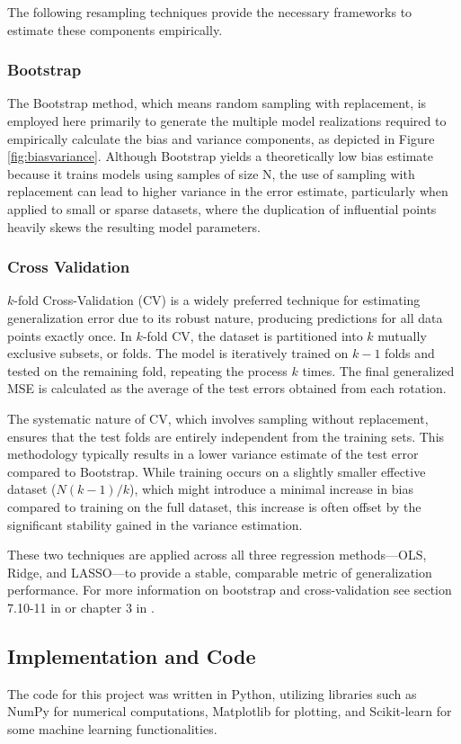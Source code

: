 \documentclass[twocolumn,aps]{revtex4}
\begin{document}
The following resampling techniques provide the necessary frameworks to estimate these components empirically.

\subsubsection{Bootstrap}
The Bootstrap method, which means random sampling with replacement, is employed here primarily to generate the multiple model realizations required to empirically calculate the bias and variance components, as depicted in Figure \ref{fig:biasvariance}. 
Although Bootstrap yields a theoretically low bias estimate because it trains models using samples of size N, the use of sampling with replacement can lead to higher variance in the error estimate, particularly when applied to small or sparse datasets, where the duplication of influential points heavily skews the resulting model parameters.

\subsubsection{Cross Validation}
$k$-fold Cross-Validation (CV) is a widely preferred technique for estimating generalization error due to its robust nature, producing predictions for all data points exactly once.
In $k$-fold CV, the dataset is partitioned into $k$ mutually exclusive subsets, or folds. 
The model is iteratively trained on $k-1$ folds and tested on the remaining fold, repeating the process $k$ times. 
The final generalized MSE is calculated as the average of the test errors obtained from each rotation.

The systematic nature of CV, which involves sampling without replacement, ensures that the test folds are entirely independent from the training sets. 
This methodology typically results in a lower variance estimate of the test error compared to Bootstrap. 
While training occurs on a slightly smaller effective dataset ($N(k-1)/k$), which might introduce a minimal increase in bias compared to training on the full dataset, this increase is often offset by the significant stability gained in the variance estimation. 

These two techniques are applied across all three regression methods—OLS, Ridge, and LASSO—to provide a stable, comparable metric of generalization performance.
For more information on bootstrap and cross-validation see section 7.10-11 in \citet{hastie} or chapter 3 in \citet{compfys}.


\subsection{Implementation and Code}
The code for this project was written in Python, utilizing libraries such as NumPy for numerical computations, Matplotlib for plotting, and Scikit-learn for some machine learning functionalities.
\end{document}
